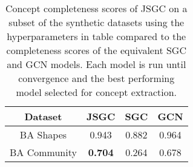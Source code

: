 \begin{table}
    \centering
    \begin{tabular}{c|c|cc}
        \textbf{Dataset} &
        \textbf{JSGC} &
        \textbf{SGC} &
        \textbf{GCN} \\
        \midrule
        BA Shapes       & 0.943 & 0.882 & 0.964 \\
        BA Community    & \textbf{0.704} & 0.264 & 0.678 \\
    \end{tabular}
    \caption{Concept completeness scores of JSGC on a subset of the synthetic datasets using the hyperparameters in table  compared to the completeness scores of the equivalent SGC and GCN models. Each model is run until convergence and the best performing model selected for concept extraction.}
    \label{tab:JSGC-completeness}
\end{table}

